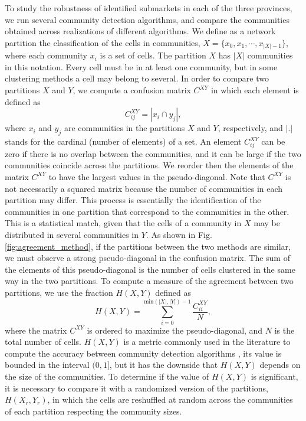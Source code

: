 To study the robustness of identified submarkets in each of the three provinces, we run several community detection algorithms, and compare the communities obtained across realizations of different algorithms. We define as a network partition the classification of the cells in communities, $X = \{x_0, x_1, \cdots , x_{|X|-1} \}$, where each community $x_i$ is a set of cells. The partition $X$ has $|X|$ communities in this notation. Every cell must be in at least one community, but in some clustering methods a cell may belong to several.
In order to compare two partitions $X$ and $Y$, we compute a confusion matrix $C^{XY}$ in which each element is defined as
\begin{equation}
    C^{XY}_{ij} = | x_i \cap y_j | ,
\end{equation}
where $x_i$ and $y_j$ are communities in the partitions $X$ and $Y$, respectively, and $| . |$ stands for the cardinal (number of elements) of a set. An element $C^{XY}_{ij}$ can be zero if there is no overlap between the communities, and it can be large if the two communities coincide across the partitions. We reorder then the elements of the matrix  $C^{XY}$ to have the largest values in the pseudo-diagonal. Note that $C^{XY}$ is not necessarily a squared matrix because the number of communities in each partition may differ. This process is essentially the identification of the communities in one partition that correspond to the communities in the other. This is a statistical match, given that the cells of a community in $X$ may be distributed in several communities in $Y$. As shown in Fig. \ref{fig:agreement_method}, if the partitions between the two methods are similar, we must observe a strong pseudo-diagonal in the confusion matrix. The sum of the elements of this pseudo-diagonal is the number of cells clustered in the same way in the two partitions. To compute a measure of the agreement between two partitions, we use the fraction $H(X,Y)$ \cite{newman2004finding,hric2014community} defined as 
\begin{equation}
H(X,Y) = \sum_{i = 0}^{\textrm{min}(|X|,|Y|)-1} \frac{C^{XY}_{ii}}{N} , 
\end{equation}
where the matrix $C^{XY}$ is ordered to maximize the pseudo-diagonal, and $N$ is the total number of cells. $H(X,Y)$ is a metric commonly used in the literature to compute the accuracy between community detection algorithms \cite{danon2005comparing,duch2005community,li2008quantitative,darst2014improving,chen2015deep,saoud2016community,wang2017mitigation,fortunato2016community}, its value is bounded in the interval $(0,1]$, but it has the downside that $H(X,Y)$ depends on the size of the communities. To determine if the value of $H(X,Y)$ is significant, it is necessary to compare it with a randomized version of the partitions, $H(X_r,Y_r)$, in which the cells are reshuffled at random across the communities of each partition respecting the community sizes.

